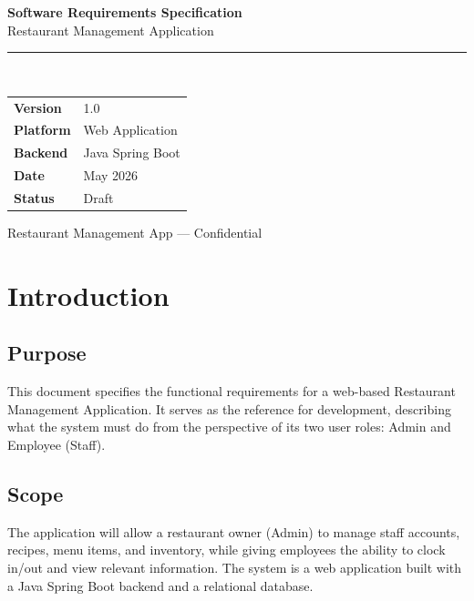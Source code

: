 \documentclass[12pt]{article}
\begin{document}
\begin{titlepage}
    \centering
    \vspace*{1.5in}
    {\huge\bfseries\color{darkblue} Software Requirements Specification\\[0.4em]}
    {\Large Restaurant Management Application\\[2em]}
    \textcolor{darkblue}{\rule{0.8\linewidth}{1.5pt}}\\[2em]
    \begin{tabular}{ll}
        \textbf{Version}   & 1.0 \\[0.5em]
        \textbf{Platform}  & Web Application \\[0.5em]
        \textbf{Backend}   & Java Spring Boot \\[0.5em]
        \textbf{Date}      & May 2026 \\[0.5em]
        \textbf{Status}    & Draft \\
    \end{tabular}
    \vfill
    \textcolor{midgray}{\small Restaurant Management App --- Confidential}
\end{titlepage}

\tableofcontents
\newpage

\section{Introduction}

\subsection{Purpose}
This document specifies the functional requirements for a web-based Restaurant Management
Application. It serves as the reference for development, describing what the system must do
from the perspective of its two user roles: Admin and Employee (Staff).

\subsection{Scope}
The application will allow a restaurant owner (Admin) to manage staff accounts, recipes,
menu items, and inventory, while giving employees the ability to clock in/out and view
relevant information. The system is a web application built with a Java Spring Boot backend
and a relational database.
\end{document}
